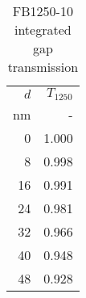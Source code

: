 \begin{table}[h!]
\caption{FB1250-10 integrated gap transmission \label{tbl_FB1250}}
\begin{center}
    \begin{tabular}{ r r}
    \hline
    $d$ & $T_{1250}$\\
    nm  & - \\
    \hline
      0 &                   1.000 \\
      8 &                   0.998 \\
     16 &                   0.991 \\
     24 &                   0.981 \\
     32 &                   0.966 \\
     40 &                   0.948 \\
     48 &                   0.928 \\
    \hline
    \end{tabular}
\end{center}
\end{table}